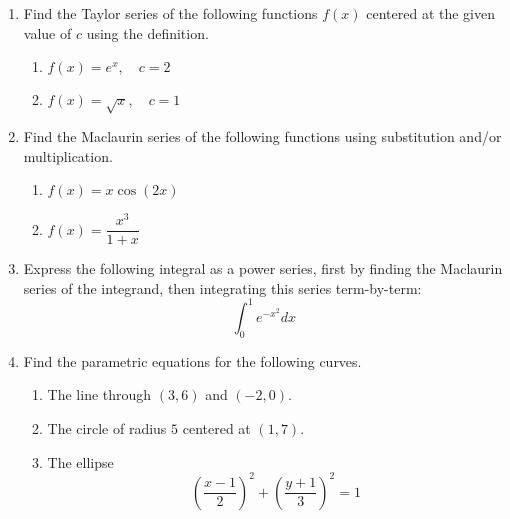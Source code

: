 \begin{enumerate}
  \item Find the Taylor series of the following functions \(f(x)\) centered at
    the given value of \(c\) using the definition.
    \begin{enumerate}[itemsep=24em]
      \item \(f(x) = e^x, \quad c = 2\)

      \item \(f(x) = \sqrt{x}, \quad c = 1\)
    \end{enumerate}

\newpage %

  \item Find the Maclaurin series of the following functions using substitution
    and/or multiplication.

    \begin{enumerate}[itemsep=24em]
      \item \(f(x) = x \cos (2x)\)

      \item \(f(x) = \dfrac{x^3}{1+x}\)
    \end{enumerate}

\newpage %

  \item Express the following integral as a power series, first by finding the
    Maclaurin series of the integrand, then integrating this series
    term-by-term:
    \[%
    \int_{0}^{1} e^{-x^2}  dx
    \]%

\newpage %

  \item Find the parametric equations for the following curves.
    \begin{enumerate}[itemsep=16em]
      \item The line through \((3,6)\) and \((-2, 0)\).

      \item The circle of radius \(5\) centered at \((1,7)\).

      \item The ellipse
        \[%
          \left( \frac{x-1}{2} \right)^2 + \left(\frac{y+1}{3}\right)^2 = 1
        \]%
    \end{enumerate}


\end{enumerate}
